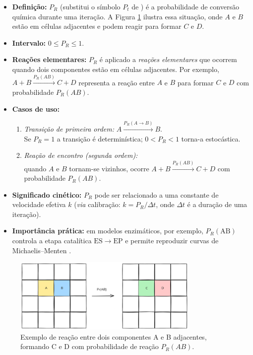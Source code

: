 \documentclass[12pt,oneside]{report}
\begin{document}
\begin{itemize}
    \item \textbf{Definição:} $P_R$ (substitui o símbolo $P_t$ de
          \citeauthor{kier2005}) é a probabilidade de conversão química
          durante uma iteração. A Figura \ref{fig:reacao} ilustra essa situação, onde $A$ e $B$ estão em células adjacentes e podem reagir para formar $C$ e $D$.
    \item \textbf{Intervalo:} $0 \le P_R \le 1$.
    \item \textbf{Reações elementares:} $P_R$ é aplicado a
          \emph{reações elementares} que ocorrem quando
          dois componentes estão em células adjacentes.
          Por exemplo, $A+B \xrightarrow{P_R(AB)} C+D$
          representa a reação entre $A$ e $B$ para formar $C$ e $D$ com probabilidade $P_R(AB)$.
    \item \textbf{Casos de uso:}
          \begin{enumerate}
              \item \emph{Transição de primeira ordem:}
                    $A \xrightarrow{P_R(A\rightarrow B)} B$.\\
                    Se $P_R=1$ a transição é determinística;
                    $0<P_R<1$ torna-a estocástica.
              \item \emph{Reação de encontro (segunda ordem):}\\
                    quando $A$ e $B$ tornam-se vizinhos,
                    ocorre $A+B \xrightarrow{P_R(AB)} C+D$
                    com probabilidade $P_R(AB)$.
          \end{enumerate}
    \item \textbf{Significado cinético:} $P_R$ pode ser relacionado a
          uma constante de velocidade efetiva $k$
          (\textit{via} calibração: $k = P_R/\Delta t$,
          onde $\Delta t$ é a duração de uma iteração).
    \item \textbf{Importância prática:}
          em modelos enzimáticos, por exemplo, $P_R(\mathrm{AB})$
          controla a etapa catalítica $\mathrm{ES}\rightarrow\mathrm{EP}$
          e permite reproduzir curvas de Michaelis–Menten
          \cite[cap.~9]{kier2005}.
\end{itemize}

\begin{figure}[H]
    \centering
    \includegraphics[width=0.8\textwidth]{reacao.png}
    \caption{\small Exemplo de reação entre dois componentes A e B adjacentes, formando C e D com probabilidade de reação $P_R(AB)$.}
    \label{fig:reacao}
\end{figure}
\end{document}
